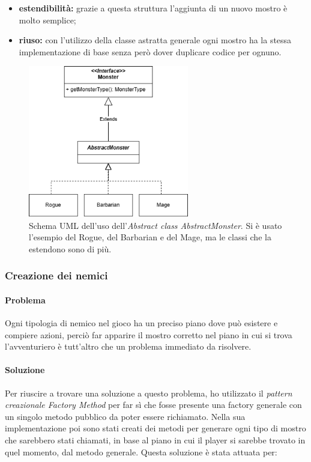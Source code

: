 \documentclass{report}
\begin{document}
\begin{itemize}
    \item \textbf{estendibilità:} grazie a questa struttura l'aggiunta di un nuovo mostro è molto semplice;
    \item \textbf{riuso:} con l'utilizzo della classe astratta generale ogni mostro ha la stessa implementazione di base senza però dover duplicare codice per ognuno.
\end{itemize}

\begin{figure}[H]
    \centering
    \includegraphics[width=7cm]{AbstractMonster.png}
    \caption{Schema UML dell'uso dell'\textit{Abstract class AbstractMonster}. Si è usato l'esempio del Rogue, del Barbarian e del Mage, ma le classi che la estendono sono di più.}
    \label{img:AbstractMonster}
\end{figure}

\subsubsection{Creazione dei nemici}

\paragraph{Problema} Ogni tipologia di nemico nel gioco ha un preciso piano dove può esistere e compiere azioni, perciò far apparire il mostro corretto nel piano in cui si trova l'avventuriero è
%
tutt'altro che un problema immediato da risolvere.

\paragraph{Soluzione} Per riuscire a trovare una soluzione a questo problema, ho utilizzato il \textit{pattern creazionale Factory Method} per far sì che fosse presente una factory generale
%
con un singolo metodo pubblico da poter essere richiamato. Nella sua implementazione poi sono stati creati dei metodi per generare ogni tipo di mostro che sarebbero stati chiamati, in base
%
al piano in cui il player si sarebbe trovato in quel momento, dal metodo generale. Questa soluzione è stata attuata per:
\end{document}
